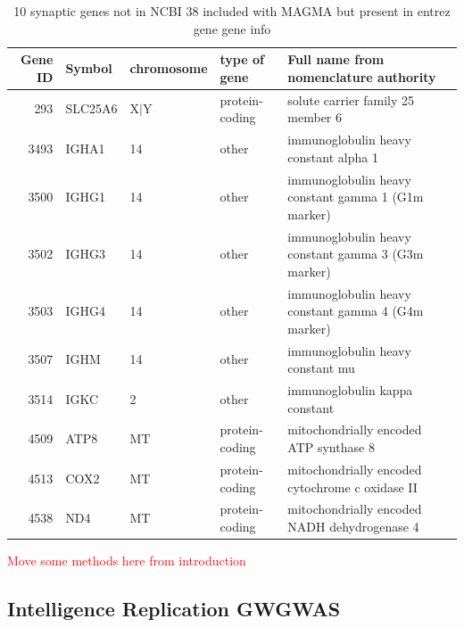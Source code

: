 \begin{table}[ht]
\centering
\begin{adjustbox}{max width=\textwidth}
\begin{tabular}{rllll}
  \hline
 Gene ID & Symbol & chromosome & type of gene & Full name from nomenclature authority \\ 
  \hline
293 & SLC25A6 & X$|$Y & protein-coding & solute carrier family 25 member 6 \\ 
  3493 & IGHA1 & 14 & other & immunoglobulin heavy constant alpha 1 \\ 
  3500 & IGHG1 & 14 & other & immunoglobulin heavy constant gamma 1 (G1m marker) \\ 
  3502 & IGHG3 & 14 & other & immunoglobulin heavy constant gamma 3 (G3m marker) \\ 
  3503 & IGHG4 & 14 & other & immunoglobulin heavy constant gamma 4 (G4m marker) \\ 
  3507 & IGHM & 14 & other & immunoglobulin heavy constant mu \\ 
  3514 & IGKC & 2 & other & immunoglobulin kappa constant \\ 
  4509 & ATP8 & MT & protein-coding & mitochondrially encoded ATP synthase 8 \\ 
  4513 & COX2 & MT & protein-coding & mitochondrially encoded cytochrome c oxidase II \\ 
  4538 & ND4 & MT & protein-coding & mitochondrially encoded NADH dehydrogenase 4 \\ 
   \hline
\end{tabular}
\end{adjustbox}
\caption{10 synaptic genes not in NCBI 38 included with MAGMA but present in entrez gene gene info}
\label{tab:10 synaptic genes not in NCBI 38 included with MAGMA but present in entrez gene gene info}
\end{table}


\textcolor{red}{Move some methods here from introduction}


\subsection{Intelligence Replication GWGWAS}


